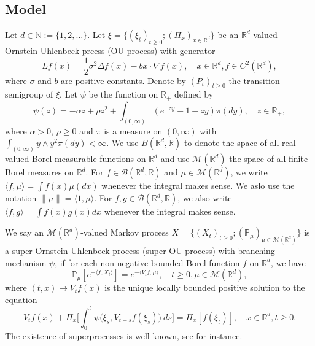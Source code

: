\documentclass[12pt,a4paper]{amsart}
\theoremstyle{plain}
\theoremstyle{definition}
\numberwithin{equation}{section}
\begin{document}
\subsection{Model}
\label{ss:1.1}
	Let $d \in \mathbb N:= \{1,2,\dots\}$.
    Let $\xi=\{(\xi_t)_{t\geq 0}; (\Pi_x)_{x\in \mathbb R^d}\}$ be an $\mathbb R^d$-valued Ornstein-Uhlenbeck prcess (OU process) with generator
\begin{equation}
\label{eq: OU generator}
    Lf(x)
        = \frac{1}{2}\sigma^2\Delta f(x)-b x \cdot \nabla f(x),
        \quad  x\in \mathbb R^d,
        f \in C^2(\mathbb R^d),
\end{equation}
    where $\sigma$ and $b$ are positive constants.
    Denote by $(P_t)_{t\geq 0}$ the transition semigroup of $\xi$.
    Let $\psi$ be the function on $\mathbb R_+$ defined by
\begin{equation}
\label{mechanism}
       \psi(z)=
    - \alpha z + \rho z^2 + \int_{(0,\infty)} (e^{-zy} - 1 + zy) \pi(dy),
    \quad  z \in \mathbb R_+,
\end{equation}
	where $\alpha > 0 $, $\rho \geq0$ and $\pi$ is a measure on $(0,\infty)$ with $\int_{(0,\infty)}y\wedge y^2 \pi(dy)< \infty$.
We use $B(\mathbb R^d, \mathbb R)$ to denote   the space of all real-valued Borel measurable functions on $\mathbb R^d$ and use $\mathcal M(\mathbb R^d)$ the space of all finite Borel measures on $\mathbb R^d$.
	For $f\in \mathcal B(\mathbb R^d, \mathbb R)$ and $\mu \in \mathcal M(\mathbb R^d)$, we write $\langle f,\mu\rangle = \int f(x)\mu(dx)$ whenever the integral makes sense.
 We aslo use the notation $\|\mu\|=\langle 1,\mu\rangle$. For $f, g\in \mathcal B(\mathbb R^d, \mathbb R)$, we also write $\langle f, g\rangle = \int f(x)g(x) dx$ whenever the integral makes sense.

    We say an $\mathcal M(\mathbb R^d)$-valued Markov process $X = \{(X_t)_{t\geq 0}; (\mathbb{P}_{\mu})_{\mu \in \mathcal M(\mathbb R^d)}\}$ is a super Ornstein-Uhlenbeck process (super-OU process) with branching mechanism $\psi$, if for each non-negative bounded Borel function $f$ on $\mathbb R^d$, we have
\begin{equation} \label{super}
    \mathbb{P}_{\mu}[e^{-\langle f,X_t \rangle}]
    = e^{-\langle V_tf, \mu \rangle},
    \quad t\geq 0, \mu \in \mathcal M(\mathbb R^d),
\end{equation}
	where $(t,x) \mapsto V_tf(x)$ is the unique locally bounded positive solution to the equation
\begin{equation}\label{eq1}
	V_tf(x) + \Pi_x \Big[ \int_0^t\psi\big(\xi_s,V_{t-s}f(\xi_s)\big)~ds\Big]
	= \Pi_x [f(\xi_t)],
    \quad x\in \mathbb R^d, t\geq 0.
\end{equation}	
    The existence of superprocesses is well known, see \cite{Dynkin1993Superprocesses} for instance.
\end{document}
